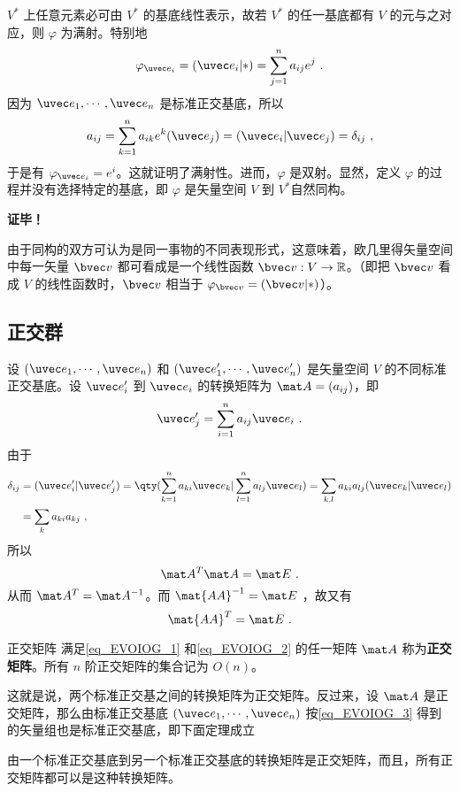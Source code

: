 $V^*$ 上任意元素必可由 $V^*$ 的基底线性表示，故若 $V^*$ 的任一基底都有 $V$ 的元与之对应，则 $\varphi$ 为满射。特别地
\begin{equation}
\varphi_{\uvec e_i}=(\uvec e_i|*)=\sum_{j=1}^{n} a_{ij}e^j~.
\end{equation}
因为  $\uvec e_1,\cdots,\uvec e_n$ 是标准正交基底，所以
\begin{equation}
a_{ij}=\sum_{k=1}^n a_{ik}e^k(\uvec e_j)=(\uvec e_i|\uvec e_j)=\delta_{ij}~,
\end{equation}
于是有 $\varphi_{\uvec e_i}=e^i$。这就证明了满射性。进而，$\varphi$ 是双射。显然，定义 $\varphi$ 的过程并没有选择特定的基底，即 $\varphi$ 是矢量空间 $V$ 到 $V^*$自然同构。

\textbf{证毕！}

由于同构的双方可认为是同一事物的不同表现形式，这意味着，欧几里得矢量空间中每一矢量 $\bvec v$ 都可看成是一个线性函数 $\bvec v:V\rightarrow\mathbb{R}$。（即把 $\bvec v$ 看成 $V$ 的线性函数时，$\bvec v$ 相当于 $\varphi_{\bvec v}=(\bvec v|*)$）。
\subsection{正交群}\label{sub_EVOIOG_1}
设 $(\uvec e_1,\cdots,\uvec e_n)$ 和 $(\uvec e'_1,\cdots,\uvec e'_n)$ 是矢量空间 $V$ 的不同标准正交基底。设 $\uvec e'_i$ 到 $\uvec e_i$ 的转换矩阵为 $\mat A=(a_{ij})$，即
\begin{equation}\label{eq_EVOIOG_3}
\uvec e'_j=\sum_{i=1}^n a_{ij}\uvec e_i~.
\end{equation}
由于
\begin{equation}
\begin{aligned}
\delta_{ij}&=(\uvec e'_i|\uvec e'_j)=\qty(\sum_{k=1}^n a_{ki}\uvec e_k|\sum_{l=1}^n a_{lj}\uvec e_l)=\sum_{k,l}a_{ki}a_{lj}(\uvec e_k|\uvec e_l)\\
&=\sum_{k}a_{ki}a_{kj}~,
\end{aligned}
\end{equation}
所以 
\begin{equation}\label{eq_EVOIOG_1}
\mat A^T \mat A=\mat E~.
\end{equation}
从而 $\mat A^T=\mat A^{-1}$。而 $\mat{AA}^{-1}=\mat E$ ，故又有
\begin{equation}\label{eq_EVOIOG_2}
\mat{AA}^T=\mat E~.
\end{equation}
\begin{definition}{正交矩阵}
满足\autoref{eq_EVOIOG_1} 和\autoref{eq_EVOIOG_2} 的任一矩阵 $\mat A$ 称为\textbf{正交矩阵}。所有 $n$ 阶正交矩阵的集合记为 $O(n)$。
\end{definition}
这就是说，两个标准正交基之间的转换矩阵为正交矩阵。反过来，设 $\mat A$ 是正交矩阵，那么由标准正交基底 $(\uvec e_1,\cdots,\uvec e_n)$ 按\autoref{eq_EVOIOG_3} 得到的矢量组也是标准正交基底，即下面定理成立
\begin{theorem}{}
由一个标准正交基底到另一个标准正交基底的转换矩阵是正交矩阵，而且，所有正交矩阵都可以是这种转换矩阵。
\end{theorem}

